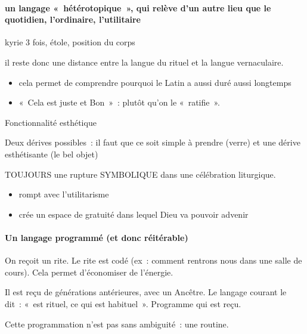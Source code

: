 \hypertarget{un-langage-huxe9tuxe9rotopique-qui-reluxe8ve-dun-autre-lieu-que-le-quotidien-lordinaire-lutilitaire}{%
\paragraph{un langage «~hétérotopique~», qui relève d'un autre
lieu que le quotidien, l'ordinaire,
l'utilitaire}\label{un-langage-huxe9tuxe9rotopique-qui-reluxe8ve-dun-autre-lieu-que-le-quotidien-lordinaire-lutilitaire}}

kyrie 3 fois, étole, position du corps

il reste donc une distance entre la langue du rituel et la langue
vernaculaire.

\begin{itemize}
\item
  cela permet de comprendre pourquoi le Latin a aussi duré aussi
  longtemps
\item
  «~Cela est juste et Bon~»~: plutôt qu'on le «~ratifie~».
\end{itemize}

Fonctionnalité esthétique

Deux dérives possibles~: il faut que ce soit simple à prendre (verre) et
une dérive esthétisante (le bel objet)

TOUJOURS une rupture SYMBOLIQUE dans une célébration liturgique.

\begin{itemize}
\item
  rompt avec l'utilitarisme
\item
  crée un espace de gratuité dans lequel Dieu va pouvoir advenir
\end{itemize}

\hypertarget{un-langage-programmuxe9-et-donc-ruxe9ituxe9rable}{%
\paragraph{Un langage programmé (et donc
réitérable)}\label{un-langage-programmuxe9-et-donc-ruxe9ituxe9rable}}

On reçoit un rite. Le rite est codé (ex~: comment rentrons nous dans une
salle de cours). Cela permet d'économiser de l'énergie.

Il est reçu de générations antérieures, avec un Ancêtre. Le langage
courant le dit~: «~est rituel, ce qui est habituel~». Programme qui est
reçu.

Cette programmation n'est pas sans ambiguité~: une routine.

